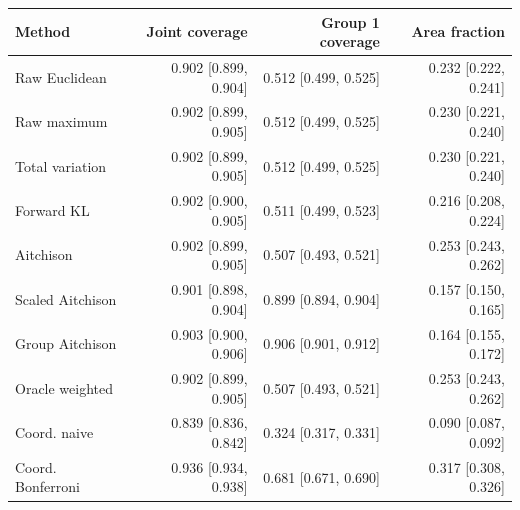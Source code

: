 \begin{tabular}{lrrr}
\toprule
Method & Joint coverage & Group 1 coverage & Area fraction \\
\midrule
Raw Euclidean & 0.902 [0.899, 0.904] & 0.512 [0.499, 0.525] & 0.232 [0.222, 0.241] \\
Raw maximum & 0.902 [0.899, 0.905] & 0.512 [0.499, 0.525] & 0.230 [0.221, 0.240] \\
Total variation & 0.902 [0.899, 0.905] & 0.512 [0.499, 0.525] & 0.230 [0.221, 0.240] \\
Forward KL & 0.902 [0.900, 0.905] & 0.511 [0.499, 0.523] & 0.216 [0.208, 0.224] \\
Aitchison & 0.902 [0.899, 0.905] & 0.507 [0.493, 0.521] & 0.253 [0.243, 0.262] \\
Scaled Aitchison & 0.901 [0.898, 0.904] & 0.899 [0.894, 0.904] & 0.157 [0.150, 0.165] \\
Group Aitchison & 0.903 [0.900, 0.906] & 0.906 [0.901, 0.912] & 0.164 [0.155, 0.172] \\
Oracle weighted & 0.902 [0.899, 0.905] & 0.507 [0.493, 0.521] & 0.253 [0.243, 0.262] \\
Coord. naive & 0.839 [0.836, 0.842] & 0.324 [0.317, 0.331] & 0.090 [0.087, 0.092] \\
Coord. Bonferroni & 0.936 [0.934, 0.938] & 0.681 [0.671, 0.690] & 0.317 [0.308, 0.326] \\
\bottomrule
\end{tabular}
